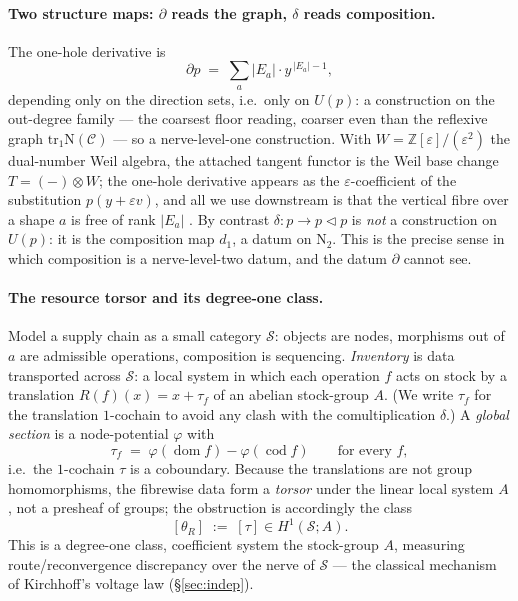 \documentclass[11pt]{article}
\theoremstyle{definition}
\newcommand{\tr}{\mathrm{tr}}
\newcommand{\Z}{\mathbb{Z}}
\newcommand{\dom}{\operatorname{dom}}
\newcommand{\cod}{\operatorname{cod}}
\newcommand{\sS}{\mathcal{S}}
\newcommand{\cC}{\mathcal{C}}
\newcommand{\lto}{\!\lhd\!}
\newcommand{\Nerve}{\mathrm{N}}
\begin{document}
\paragraph{Two structure maps: $\partial$ reads the graph, $\delta$ reads composition.}
The one-hole derivative \cite{AAGM2003} is
\[
   \partial p \;=\; \sum_a |E_a|\cdot y^{\,|E_a|-1},
\]
depending only on the direction sets, i.e.\ only on $U(p)$: a construction on the out-degree family
--- the coarsest floor reading, coarser even than the reflexive graph $\tr_1\Nerve(\cC)$ --- so a
nerve-level-one construction. With $W=\Z[\varepsilon]/(\varepsilon^2)$ the dual-number Weil
algebra, the attached tangent functor is the Weil base change $T=(-)\otimes W$; the one-hole
derivative appears as the $\varepsilon$-coefficient of the substitution $p(y+\varepsilon v)$, and all
we use downstream is that the vertical fibre over a shape $a$ is free of rank $|E_a|$
\cite{MacBethCartan,MacBethParallel}. By contrast $\delta\colon p\to p\lto p$ is \emph{not} a
construction on $U(p)$: it is the composition map $d_1$, a datum on $\Nerve_2$. This is the precise
sense in which composition is a nerve-level-two datum, and the datum $\partial$ cannot see.

\paragraph{The resource torsor and its degree-one class.}
Model a supply chain as a small category $\sS$: objects are nodes, morphisms out of $a$ are
admissible operations, composition is sequencing. \emph{Inventory} is data transported across $\sS$:
a local system in which each operation $f$ acts on stock by a translation $R(f)(x)=x+\tau_f$ of an
abelian stock-group $A$. (We write $\tau_f$ for the translation $1$-cochain to avoid any clash with
the comultiplication $\delta$.) A \emph{global section} is a node-potential $\varphi$ with
\[
   \tau_f \;=\; \varphi(\dom f)-\varphi(\cod f)\qquad\text{for every }f,
\]
i.e.\ the $1$-cochain $\tau$ is a coboundary. Because the translations are not group homomorphisms,
the fibrewise data form a \emph{torsor} under the linear local system $A$, not a presheaf of groups;
the obstruction is accordingly the class
\[
   [\theta_R]\;:=\;[\tau]\in H^1(\sS;A).
\]
This is a degree-one class, coefficient system the stock-group $A$, measuring route/reconvergence
discrepancy over the nerve of $\sS$ --- the classical mechanism of Kirchhoff's voltage law
(\S\ref{sec:indep}).
\end{document}
